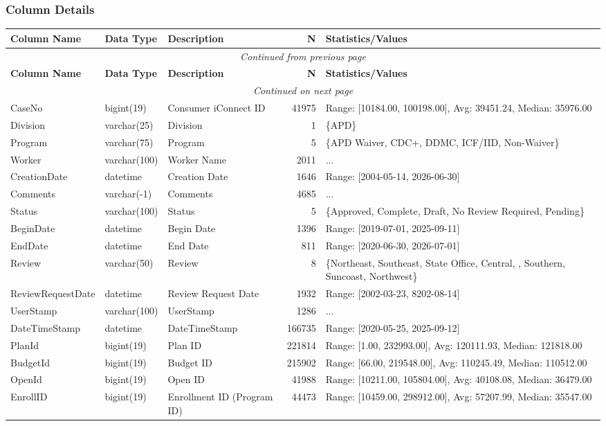 \begin{landscape}
\subsubsection{Column Details}
\begin{longtable}{|l|l|l|r|p{6cm}|}
\hline
\textbf{Column Name} & \textbf{Data Type} & \textbf{Description} & \textbf{N} & \textbf{Statistics/Values} \\
\hline
\endfirsthead
\multicolumn{5}{c}{\textit{Continued from previous page}} \\
\hline
\textbf{Column Name} & \textbf{Data Type} & \textbf{Description} & \textbf{N} & \textbf{Statistics/Values} \\
\hline
\endhead
\hline
\multicolumn{5}{c}{\textit{Continued on next page}} \\
\endfoot
\hline
\endlastfoot
CaseNo & bigint(19) & Consumer iConnect ID & 41975 & Range: [10184.00, 100198.00], Avg: 39451.24, Median: 35976.00 \\
\hline
Division & varchar(25) & Division & 1 & \{APD\} \\
\hline
Program & varchar(75) & Program & 5 & \{APD Waiver, CDC+, DDMC, ICF/IID, Non-Waiver\} \\
\hline
Worker & varchar(100) & Worker Name & 2011 & ... \\
\hline
CreationDate & datetime & Creation Date & 1646 & Range: [2004-05-14, 2026-06-30] \\
\hline
Comments & varchar(-1) & Comments & 4685 & ... \\
\hline
Status & varchar(100) & Status & 5 & \{Approved, Complete, Draft, No Review Required, Pending\} \\
\hline
BeginDate & datetime & Begin Date & 1396 & Range: [2019-07-01, 2025-09-11] \\
\hline
EndDate & datetime & End Date & 811 & Range: [2020-06-30, 2026-07-01] \\
\hline
Review & varchar(50) & Review & 8 & \{Northeast, Southeast, State Office, Central, , Southern, Suncoast, Northwest\} \\
\hline
ReviewRequestDate & datetime & Review Request Date & 1932 & Range: [2002-03-23, 8202-08-14] \\
\hline
UserStamp & varchar(100) & UserStamp & 1286 & ... \\
\hline
DateTimeStamp & datetime & DateTimeStamp & 166735 & Range: [2020-05-25, 2025-09-12] \\
\hline
PlanId & bigint(19) & Plan ID & 221814 & Range: [1.00, 232993.00], Avg: 120111.93, Median: 121818.00 \\
\hline
BudgetId & bigint(19) & Budget ID & 215902 & Range: [66.00, 219548.00], Avg: 110245.49, Median: 110512.00 \\
\hline
OpenId & bigint(19) & Open ID & 41988 & Range: [10211.00, 105804.00], Avg: 40108.08, Median: 36479.00 \\
\hline
EnrollID & bigint(19) & Enrollment ID (Program ID) & 44473 & Range: [10459.00, 298912.00], Avg: 57207.99, Median: 35547.00 \\
\hline
\end{longtable}


\end{landscape}
